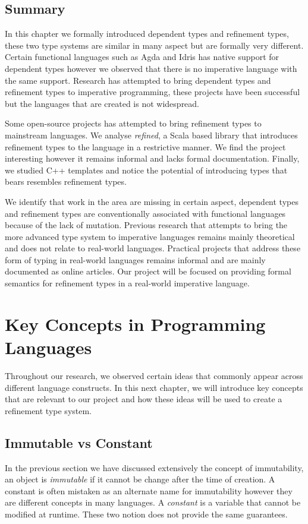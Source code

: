 \documentclass[a4paper,12pt]{report}
\begin{document}
\section{Summary}

In this chapter we formally introduced dependent types and refinement types, 
these two type systems are similar in many aspect but are formally very 
different. Certain functional languages such as Agda and Idris has native support for 
dependent types however we observed that there is no imperative language with 
the same support. Research has attempted to bring dependent types and refinement types 
to imperative programming, these projects have been successful but the languages 
that are created is not widespread. 

\par
Some open-source projects has attempted to bring refinement types to mainstream 
languages. We analyse \textit{refined}, a Scala based library that 
introduces refinement types to the language in a restrictive manner. We find the 
project interesting however it remains informal and lacks formal documentation. 
Finally, we studied C++ templates and notice the potential of introducing 
types that bears resembles refinement types.

\par
We identify that work in the area are missing in certain aspect, dependent types 
and refinement types are conventionally associated with functional languages 
because of the lack of mutation. Previous research that attempts to bring the more 
advanced type system to imperative languages remains mainly theoretical and 
does not relate to real-world languages. Practical projects that address 
these form of typing in real-world languages remains informal and are 
mainly documented as online articles. Our project will be focused on providing 
formal semantics for refinement types in a real-world imperative language. 

\chapter{Key Concepts in Programming Languages} \label{chapter:key_concepts}
Throughout our research, we observed certain ideas that commonly appear across 
different language constructs. In this next chapter, we will introduce key concepts that are 
relevant to our project and how these ideas will be used to create a refinement 
type system.

\section{Immutable vs Constant} \label{section:const_immutable}
In the previous section we have discussed extensively the concept of 
immutability, an object is \textit{immutable} if it cannot be change after the 
time of creation. A constant is often mistaken as an alternate name for 
immutability however they are different concepts in many languages. A \textit{constant} is a 
variable that cannot be modified at runtime. These two notion does not provide the 
same guarantees.
\end{document}
